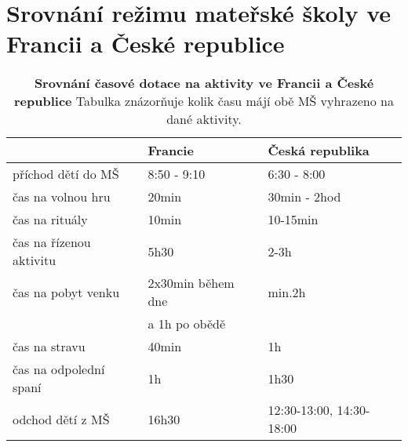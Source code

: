 


	\section{Srovnání režimu mateřské školy ve Francii a České republice}
\label{srovnani}


\begin{table}[h]
	
	\begin{tabular}{|l|l|l|}
	\hline
	\rowcolor{grey}
								& \textbf{Francie}				& \textbf{Česká republika}	\\
	\hline
	\hline
\rowcolor{grey!10}	 příchod dětí do MŠ			& 8:50 - 9:10				& 6:30 - 8:00			\\ 
\rowcolor{grey!50}	 čas na volnou hru 			& 20min 					&30min - 2hod 	\\ 
\rowcolor{grey!10}	 čas na rituály 			&10min 						&10-15min \\
\rowcolor{grey!50}	 čas na řízenou aktivitu	&5h30 						&2-3h   \\ %
\rowcolor{grey!10}	 čas na pobyt venku     	&2x30min během dne			&min.2h 	\\ 
\rowcolor{grey!10}								&a 1h po obědě				& \\ 
\rowcolor{grey!50}	 čas na stravu				&40min						&1h \\
\rowcolor{grey!10}	 čas na odpolední spaní 	&1h 						&1h30 	\\
\rowcolor{grey!50}	 odchod dětí z MŠ			&16h30						&12:30-13:00, 14:30-18:00	\\														 
	 \hline
	  
	\end{tabular}
	\label{srovnanirezimdne}
	\caption{ \textbf{Srovnání časové dotace na aktivity ve Francii a České republice} Tabulka znázorňuje kolik času májí obě MŠ vyhrazeno na dané aktivity. %
	}
\end{table}


